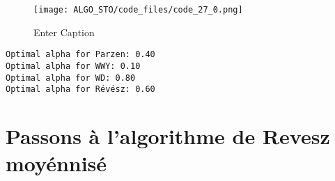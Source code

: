 \documentclass[11pt]{article}
\begin{document}
\begin{figure}
    \texttt{[image: ALGO\_STO/code\_files/code\_27\_0.png]}
    \caption{Enter Caption}
    \label{fig:enter-label}
\end{figure}
    
    \begin{Verbatim}[commandchars=\\\{\}]
Optimal alpha for Parzen: 0.40
Optimal alpha for WWY: 0.10
Optimal alpha for WD: 0.80
Optimal alpha for Révész: 0.60
    \end{Verbatim}

    \hypertarget{passons-uxe0-lalgorithme-de-revesz-moyuxe9nnisuxe9}{%
\section{Passons à l'algorithme de Revesz
moyénnisé}\label{passons-uxe0-lalgorithme-de-revesz-moyuxe9nnisuxe9}}
\end{document}

